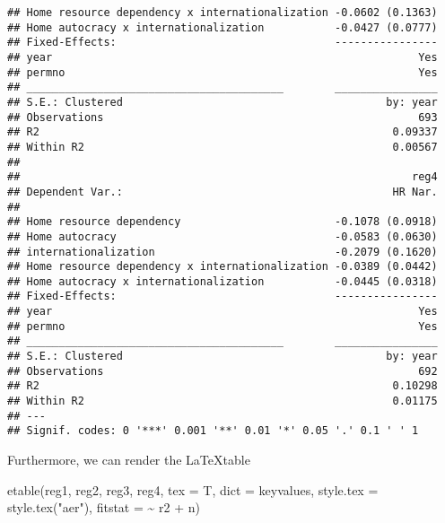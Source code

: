 \documentclass[
]{article}
\newenvironment{Shaded}{\begin{snugshade}}{\end{snugshade}}
\newcommand{\AttributeTok}[1]{\textcolor[rgb]{0.77,0.63,0.00}{#1}}
\newcommand{\FunctionTok}[1]{\textcolor[rgb]{0.00,0.00,0.00}{#1}}
\newcommand{\NormalTok}[1]{#1}
\newcommand{\SpecialCharTok}[1]{\textcolor[rgb]{0.00,0.00,0.00}{#1}}
\newcommand{\StringTok}[1]{\textcolor[rgb]{0.31,0.60,0.02}{#1}}
\begin{document}
\begin{verbatim}
## Home resource dependency x internationalization -0.0602 (0.1363)
## Home autocracy x internationalization           -0.0427 (0.0777)
## Fixed-Effects:                                  ----------------
## year                                                         Yes
## permno                                                       Yes
## ________________________________________        ________________
## S.E.: Clustered                                         by: year
## Observations                                                 693
## R2                                                       0.09337
## Within R2                                                0.00567
## 
##                                                             reg4
## Dependent Var.:                                          HR Nar.
##                                                                 
## Home resource dependency                        -0.1078 (0.0918)
## Home autocracy                                  -0.0583 (0.0630)
## internationalization                            -0.2079 (0.1620)
## Home resource dependency x internationalization -0.0389 (0.0442)
## Home autocracy x internationalization           -0.0445 (0.0318)
## Fixed-Effects:                                  ----------------
## year                                                         Yes
## permno                                                       Yes
## ________________________________________        ________________
## S.E.: Clustered                                         by: year
## Observations                                                 692
## R2                                                       0.10298
## Within R2                                                0.01175
## ---
## Signif. codes: 0 '***' 0.001 '**' 0.01 '*' 0.05 '.' 0.1 ' ' 1
\end{verbatim}

Furthermore, we can render the \LaTeX table

\begin{Shaded}
\begin{Highlighting}[]
\FunctionTok{etable}\NormalTok{(reg1, reg2, reg3, reg4,}
       \AttributeTok{tex =}\NormalTok{ T,}
       \AttributeTok{dict =}\NormalTok{ keyvalues,}
       \AttributeTok{style.tex =} \FunctionTok{style.tex}\NormalTok{(}\StringTok{"aer"}\NormalTok{),}
       \AttributeTok{fitstat =} \SpecialCharTok{\textasciitilde{}}\NormalTok{ r2 }\SpecialCharTok{+}\NormalTok{ n)}
\end{Highlighting}
\end{Shaded}
\end{document}
